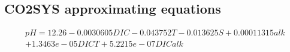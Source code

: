 \documentclass{ruthesis}
\begin{document}
\subsection{CO2SYS approximating equations}


\begin{equation}
\begin{aligned}
pH = 12.26 -0.0030605 DIC -0.043752 T -0.013625 S+ 0.00011315 alk\\
+ 1.3463e-05 DIC T + 5.2215e-07 DIC alk
\end{aligned}
\end{equation}



%
%
%
\end{document}
